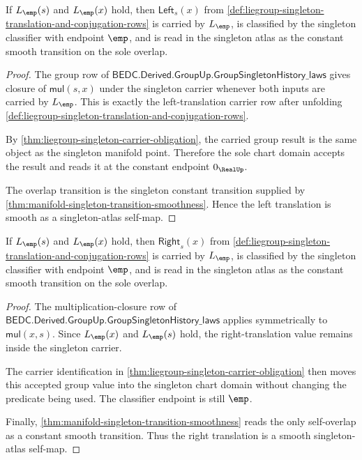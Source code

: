 \begin{theorem}
\label{thm:liegroup-singleton-left-translation-smooth}
If $L_{\emp}(s)$ and $L_{\emp}(x)$ hold, then
$\mathsf{Left}_s(x)$ from
\autoref{def:liegroup-singleton-translation-and-conjugation-rows} is carried by
$L_{\emp}$, is classified by the singleton classifier with endpoint $\emp$, and
is read in the singleton atlas as the constant smooth transition on the sole
overlap.
\end{theorem}
\begin{proof}
The group row of
$\mathsf{BEDC.Derived.GroupUp.GroupSingletonHistory\_laws}$ gives closure of
$\mathsf{mul}(s,x)$ under the singleton carrier whenever both inputs are carried
by $L_{\emp}$. This is exactly the left-translation carrier row after unfolding
\autoref{def:liegroup-singleton-translation-and-conjugation-rows}.

By \autoref{thm:liegroup-singleton-carrier-obligation}, the carried group result
is the same object as the singleton manifold point. Therefore the sole chart
domain accepts the result and reads it at the constant endpoint $0_{\RealUp}$.

The overlap transition is the singleton constant transition supplied by
\autoref{thm:manifold-singleton-transition-smoothness}. Hence the left
translation is smooth as a singleton-atlas self-map.
\end{proof}

\begin{theorem}
\label{thm:liegroup-singleton-right-translation-smooth}
If $L_{\emp}(s)$ and $L_{\emp}(x)$ hold, then
$\mathsf{Right}_s(x)$ from
\autoref{def:liegroup-singleton-translation-and-conjugation-rows} is carried by
$L_{\emp}$, is classified by the singleton classifier with endpoint $\emp$, and
is read in the singleton atlas as the constant smooth transition on the sole
overlap.
\end{theorem}
\begin{proof}
The multiplication-closure row of
$\mathsf{BEDC.Derived.GroupUp.GroupSingletonHistory\_laws}$ applies symmetrically
to $\mathsf{mul}(x,s)$. Since $L_{\emp}(x)$ and $L_{\emp}(s)$ hold, the
right-translation value remains inside the singleton carrier.

The carrier identification in
\autoref{thm:liegroup-singleton-carrier-obligation} then moves this accepted
group value into the singleton chart domain without changing the predicate being
used. The classifier endpoint is still $\emp$.

Finally, \autoref{thm:manifold-singleton-transition-smoothness} reads the only
self-overlap as a constant smooth transition. Thus the right translation is a
smooth singleton-atlas self-map.
\end{proof}

